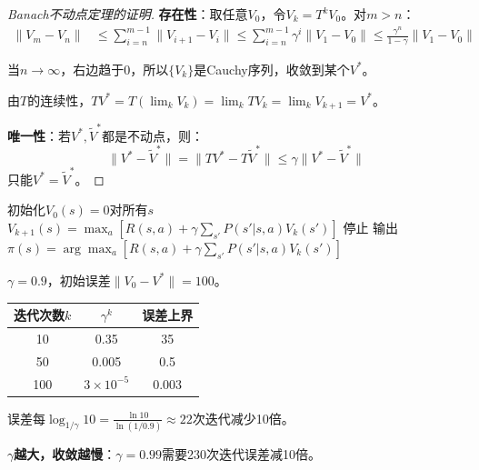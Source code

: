 \documentclass[11pt,a4paper]{article}
\theoremstyle{definition}
\begin{document}
\begin{proof}[Banach不动点定理的证明]
\textbf{存在性}：取任意$V_0$，令$V_k = T^k V_0$。对$m > n$：
\begin{align*}
\|V_m - V_n\| &\leq \sum_{i=n}^{m-1} \|V_{i+1} - V_i\| \leq \sum_{i=n}^{m-1} \gamma^i \|V_1 - V_0\| \leq \frac{\gamma^n}{1-\gamma} \|V_1 - V_0\|
\end{align*}

当$n \to \infty$，右边趋于0，所以$\{V_k\}$是Cauchy序列，收敛到某个$V^*$。

由$T$的连续性，$TV^* = T(\lim_k V_k) = \lim_k TV_k = \lim_k V_{k+1} = V^*$。

\textbf{唯一性}：若$V^*, \tilde{V}^*$都是不动点，则：
\[
\|V^* - \tilde{V}^*\| = \|TV^* - T\tilde{V}^*\| \leq \gamma \|V^* - \tilde{V}^*\|
\]
只能$V^* = \tilde{V}^*$。
\end{proof}

\begin{algorithm}[H]
\caption{值迭代 (Value Iteration)}
\begin{algorithmic}[1]
\State 初始化$V_0(s) = 0$对所有$s$
        \State $V_{k+1}(s) = \max_a \left[R(s,a) + \gamma \sum_{s'} P(s'|s,a) V_k(s')\right]$
    \EndFor
        \State 停止
    \EndIf
\EndFor
\State 输出$\pi(s) = \arg\max_a [R(s,a) + \gamma \sum_{s'} P(s'|s,a) V_k(s')]$
\end{algorithmic}
\end{algorithm}

\begin{calculation}[收敛速度]
$\gamma = 0.9$，初始误差$\|V_0 - V^*\| = 100$。

\begin{center}
\begin{tabular}{c|c|c}
\toprule
迭代次数$k$ & $\gamma^k$ & 误差上界 \\
\midrule
10 & 0.35 & 35 \\
50 & 0.005 & 0.5 \\
100 & $3\times10^{-5}$ & 0.003 \\
\bottomrule
\end{tabular}
\end{center}

误差每$\log_{1/\gamma} 10 = \frac{\ln 10}{\ln(1/0.9)} \approx 22$次迭代减少10倍。

\textbf{$\gamma$越大，收敛越慢}：$\gamma=0.99$需要230次迭代误差减10倍。
\end{calculation}
\end{document}
